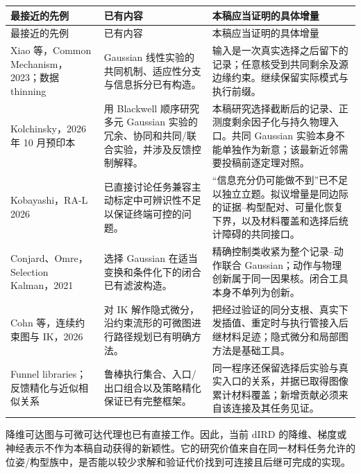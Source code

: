 \documentclass[UTF8,fontset=fandol,zihao=5,a4paper]{ctexart}
\theoremstyle{definition}
\theoremstyle{remark}\newtheorem{remark}[theorem]{说明}
\numberwithin{equation}{section}
\begin{document}
\begin{longtable}{p{.24\linewidth}p{.33\linewidth}p{.35\linewidth}}
\toprule 最接近的先例 & 已有内容 & 本稿应当证明的具体增量\\\midrule\endfirsthead
\toprule 最接近的先例 & 已有内容 & 本稿应当证明的具体增量\\\midrule\endhead
Xiao 等，Common Mechanism，2023\cite{xiao}；数据 thinning\cite{thinning}
& Gaussian 线性实验的共同机制、适应性分支与信息拆分已有构造。
& 输入是一次真实选择之后留下的记录；任意核受到共同剩余及源边缘约束。继续保留实际模式与执行前缀。\\
Kolchinsky，2026 年 10 月预印本\cite{kolchinsky}
& 用 Blackwell 顺序研究多元 Gaussian 实验的冗余、协同和共同/联合实验，并涉及反馈控制解释。
& 本稿研究选择截断后的记录、正测度剩余因子化与持久物理入口。共同 Gaussian 实验本身不能单独作为新意；该最新近邻需要投稿前逐定理对照。\\
Kobayashi，RA-L 2026\cite{kobayashi}
& 已直接讨论任务兼容主动标定中可辨识性不足以保证终端可控的问题。
& “信息充分仍可能做不到”已不足以独立立题。拟议增量是同边际的证据--构型配对、可量化恢复下界，以及材料覆盖和选择后统计障碍的共同接口。\\
Conjard、Omre，Selection Kalman，2021\cite{selectionkalman}
& 选择 Gaussian 在适当变换和条件化下的闭合已有滤波构造。
& 精确控制类收紧为整个记录--动作联合 Gaussian；动作与物理创新属于同一因果核。闭合工具本身不单列为创新。\\
Cohn 等，连续约束图与 IK，2026\cite{cohn2026}
& 对 IK 解作隐式微分，沿约束流形的可微图进行路径规划已有明确方法。
& 把经过验证的同分支根、真实下发插值、重定时与执行管接入后继材料足迹；隐式微分和局部图方法是基础工具。\\
Funnel libraries\cite{funnels}；反馈精化与近似相似关系\cite{frr,hsa}
& 鲁棒执行集合、入口/出口组合以及策略精化保证已有完整框架。
& 同一程序还保留选择后实验与真实入口的关系，并据已取得图像累计材料覆盖；新增贡献必须来自该连接及其任务见证。\\
\bottomrule
\end{longtable}

降维可达图与可微可达代理也已有直接工作\cite{rm4d,drm}。因此，当前 dIRD 的降维、梯度或神经表示不作为本稿自动获得的新颖性。它的研究价值来自在同一材料任务允许的位姿/构型族中，是否能以较少求解和验证代价找到可连接且后继可完成的实现。
\end{document}
